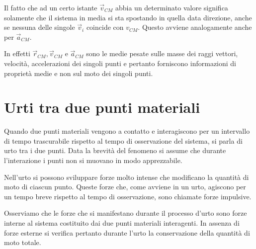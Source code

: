 \documentclass[class=book, crop=false, oneside, 12pt]{standalone}
\begin{document}
Il fatto che ad un certo istante \(\overrightarrow{v}_{CM}\) abbia un determinato valore significa solamente che il sistema in media si sta spostando in quella data direzione, anche se nessuna delle singole \(\overrightarrow{v}_i\) coincide con \(v_{CM}\).
Questo avviene analogamente anche per \(\overrightarrow{a}_{CM}\).

In effetti \(\overrightarrow{r}_{CM}, \overrightarrow{v}_{CM}\) e \(\overrightarrow{a}_{CM}\) sono le medie pesate sulle masse dei raggi vettori, velocità, accelerazioni dei singoli punti e pertanto forniscono informazioni di proprietà medie e non sul moto dei singoli punti. 

\section{Urti tra due punti materiali}

Quando due punti materiali vengono a contatto e interagiscono per un intervallo di tempo trascurabile rispetto al tempo di osservazione del sistema, si parla di urto tra i due punti.
Data la brevità del fenomeno si assume che durante l'interazione i punti non si muovano in modo apprezzabile.

Nell'urto si possono sviluppare forze molto intense che modificano la quantità di moto di ciascun punto.
Queste forze che, come avviene in un urto, agiscono per un tempo breve rispetto al tempo di osservazione, sono chiamate forze impulsive.

Osserviamo che le forze che si manifestano durante il processo d'urto sono forze interne al sistema costituito dai due punti materiali interagenti. 
In assenza di forze esterne si verifica pertanto durante l'urto la conservazione della quantità di moto totale.
\end{document}
